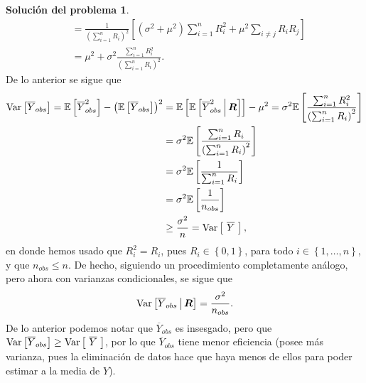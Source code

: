 \documentclass[twoside,12pt]{article}
\theoremstyle{definition}
\newtheorem{soln}{Solución del problema}
\newcommand{\variance}{\mathrm{\normalfont Var}}
\newcommand{\expectation}[1]{\mathbb{E}\left[#1\right]}
\newcommand{\given}{\,\middle|\,}
\begin{document}
\begin{soln}
\[\begin{split}
  &= \frac{1}{{\left(\sum_{i=1}^{n} R_i\right)}^2} \left[(\sigma^2+\mu^2)\sum_{i=1}^{n} R_i^2 + \mu^2\sum_{i\neq j}R_i R_j\right]\\
  &= \mu^2+\sigma^2\frac{\sum_{i=1}^{n} R_i^2}{{\left(\sum_{i=1}^{n} R_i\right)}^2}.
\end{split}
\]
De lo anterior se sigue que
\[
\begin{split}
  \variance \left[\overline{Y}_{obs}\right] = \expectation{\overline{Y}_{obs}^2}-{\left(\expectation{\overline{Y}_{obs}}\right)}^2 &= \expectation{\expectation{\overline{Y}_{obs}^2\given \boldsymbol{R}}}-\mu^2
  = \sigma^2 \expectation{\frac{\sum_{i=1}^{n} R_i^2}{{\left(\sum_{i=1}^{n} R_i\right)}^2}}\\
  &= \sigma^2 \expectation{\frac{\sum_{i=1}^{n} R_i}{{\left(\sum_{i=1}^{n} R_i\right)}^2}}\\
  &= \sigma^2 \expectation{\frac{1}{\sum_{i=1}^{n} R_i}}\\
  &= \sigma^2 \expectation{\frac{1}{n_{obs}}}\\
  &\geq \frac{\sigma^2}{n} = \variance \left[\ \overline{Y}\ \right],
\end{split}
\]
en donde hemos usado que $R_i^2 = R_i$, pues $R_i\in \left\lbrace 0, 1 \right\rbrace$, para todo $i\in \left\lbrace 1, \ldots, n \right\rbrace$, y que $n_{obs}\leq n$. De hecho, siguiendo un procedimiento completamente análogo, pero ahora con varianzas condicionales, se sigue que
\[
\variance \left[\overline{Y}_{obs} \given \boldsymbol{R}\right] = \frac{\sigma^2}{n_{obs}}.
\]
De lo anterior podemos notar que $\overline{Y}_{obs}$ es insesgado, pero que $\variance \left[\overline{Y}_{obs}\right] \geq \variance \left[\ \overline{Y}\ \right]$, por lo que $\overline{Y}_{obs}$ tiene menor eficiencia (posee más varianza, pues la eliminación de datos hace que haya menos de ellos para poder estimar a la media de $Y$).
\end{soln}
\end{document}
